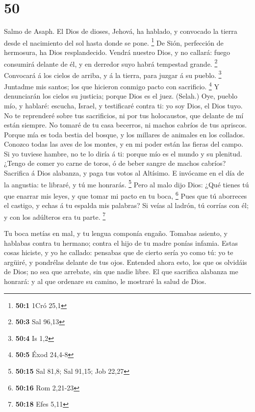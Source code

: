 \hypertarget{section-49}{%
\section{50}\label{section-49}}

 Salmo de Asaph. El Dios de dioses, Jehová, ha hablado, y
convocado la tierra desde el nacimiento del sol hasta donde se pone.
\footnote{\textbf{50:1} 1Cró 25,1}  De Sión, perfección de
hermosura, ha Dios resplandecido.  Vendrá nuestro Dios, y no
callará: fuego consumirá delante de él, y en derredor suyo habrá
tempestad grande. \footnote{\textbf{50:3} Sal 96,13} 
Convocará á los cielos de arriba, y á la tierra, para juzgar á su
pueblo. \footnote{\textbf{50:4} Is 1,2}  Juntadme mis
santos; los que hicieron conmigo pacto con sacrificio. \footnote{\textbf{50:5}
  Éxod 24,4-8}  Y denunciarán los cielos su justicia; porque
Dios es el juez. (Selah.)  Oye, pueblo mío, y hablaré:
escucha, Israel, y testificaré contra ti: yo soy Dios, el Dios tuyo.
 No te reprenderé sobre tus sacrificios, ni por tus
holocaustos, que delante de mí están siempre.  No tomaré de
tu casa becerros, ni machos cabríos de tus apriscos. 
Porque mía es toda bestia del bosque, y los millares de animales en los
collados.  Conozco todas las aves de los montes, y en mi
poder están las fieras del campo.  Si yo tuviese hambre, no
te lo diría á ti: porque mío es el mundo y su plenitud. 
¿Tengo de comer yo carne de toros, ó de beber sangre de machos cabríos?
 Sacrifica á Dios alabanza, y paga tus votos al Altísimo.
 E invócame en el día de la angustia: te libraré, y tú me
honrarás. \footnote{\textbf{50:15} Sal 81,8; Sal 91,15; Job 22,27}
 Pero al malo dijo Dios: ¿Qué tienes tú que enarrar mis
leyes, y que tomar mi pacto en tu boca, \footnote{\textbf{50:16} Rom
  2,21-23}  Pues que tú aborreces el castigo, y echas á tu
espalda mis palabras?  Si veías al ladrón, tú corrías con
él; y con los adúlteros era tu parte. \footnote{\textbf{50:18} Efes 5,11}

 Tu boca metías en mal, y tu lengua componía engaño.
 Tomabas asiento, y hablabas contra tu hermano; contra el
hijo de tu madre ponías infamia.  Estas cosas hiciste, y yo
he callado: pensabas que de cierto sería yo como tú: yo te argüiré, y
pondrélas delante de tus ojos.  Entended ahora esto, los
que os olvidáis de Dios; no sea que arrebate, sin que nadie libre.
 El que sacrifica alabanza me honrará: y al que ordenare su
camino, le mostraré la salud de Dios.

